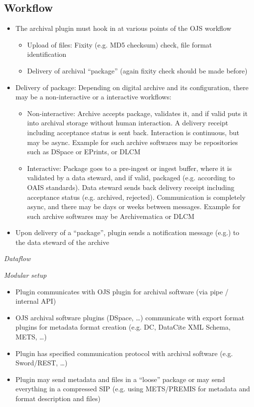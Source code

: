 \documentclass{article}
\begin{document}
\subsection[{Workflow}]{\label{qt8vsct0yswp}Workflow}
\begin{itemize}
\item The archival plugin must hook in at various points of the OJS workflow
\begin{itemize}
\item Upload of files: Fixity (e.g. MD5 checksum) check, file format identification
\item Delivery of archival “package” (again fixity check should be made before)
\end{itemize} 
\item Delivery of package: Depending on digital archive and its configuration, there may be a non-interactive or a interactive workflows:
\begin{itemize}
\item Non-interactive: Archive accepts package, validates it, and if valid puts it into archival storage without human interaction. A delivery receipt including acceptance status is sent back. Interaction is continuous, but may be async. Example for such archive softwares may be repositories such as DSpace or EPrints, or DLCM
\item Interactive: Package goes to a pre-ingest or ingest buffer, where it is validated by a data steward, and if valid, packaged (e.g. according to OAIS standards). Data steward sends back delivery receipt including acceptance status (e.g. archived, rejected). Communication is completely async, and there may be days or weeks between messages. Example for such archive softwares may be Archivematica or DLCM
\end{itemize} 
\item Upon delivery of a “package”, plugin sends a notification message (e.g.) to the data steward of the archive
\end{itemize} \par
{\itshape Dataflow}\par
{\itshape Modular setup}
\begin{itemize}
\item Plugin communicates with OJS plugin for archival software (via pipe / internal API)
\item OJS archival software plugins (DSpace, …) communicate with export format plugins for metadata format creation (e.g. DC, DataCite XML Schema, METS, …)
\item Plugin has specified communication protocol with archival software (e.g. Sword/REST, …)
\item Plugin may send metadata and files in a “loose” package or may send everything in a compressed SIP (e.g. using METS/PREMIS for metadata and format description and files)
\end{itemize} \par
\end{document}
